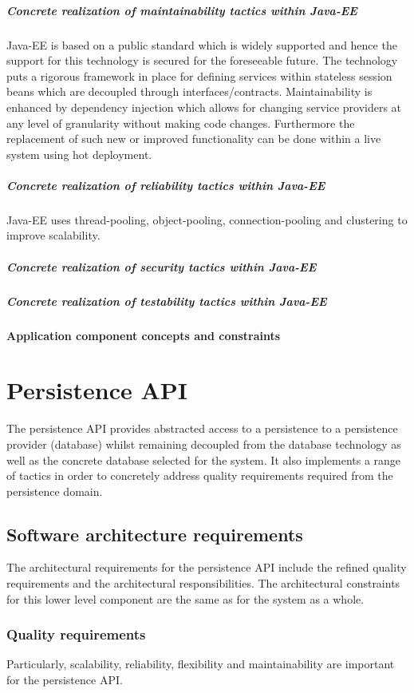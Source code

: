 \documentclass[a4paper,12pt]{report}
\begin{document}
\subparagraph {Concrete realization of maintainability tactics  within Java-EE}
Java-EE is based on a public standard which is widely supported and hence the support for this technology is secured for the foreseeable future. The technology puts a rigorous framework in place for defining services within stateless session beans which are decoupled through interfaces/contracts. Maintainability is enhanced by dependency injection which allows for changing service providers at any level of granularity without making code changes. Furthermore the replacement of such new
or improved functionality can be done within a live system using hot deployment.

\subparagraph {Concrete realization of reliability tactics  within Java-EE}
\hfill \break
Java-EE uses thread-pooling, object-pooling, connection-pooling and clustering to improve scalability.

\subparagraph {Concrete realization of security tactics  within Java-EE}
\hfill \break

\subparagraph {Concrete realization of testability tactics  within Java-EE}
\hfill \break

\paragraph {Application component concepts and constraints}


\section {Persistence API}
The persistence API provides abstracted access to a persistence to a persistence provider (database)
whilst remaining decoupled from the database technology as well as the concrete database selected
for the system. It also implements a range of tactics in order to concretely address quality requirements required from the persistence domain.

\subsection {Software architecture requirements}
The architectural requirements for the persistence API include the refined quality requirements and
the architectural responsibilities. The architectural constraints for this lower level component are
the same as for the system as a whole.

\subsubsection {Quality requirements}
Particularly, scalability, reliability, flexibility and maintainability are important for the persistence API.
\end{document}
